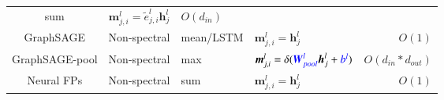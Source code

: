 \begin{table}
\begin{footnotesize}
\begin{tabular}{ccp{8em}p{22em}r}
            sum                                                                                                                       &
            $\boldsymbol{m}_{j, i}^l = \tilde{e}_{j, i}^l \boldsymbol{h}_j^l$                                                         &
            $O(d_{in})$                                                                                                                 \\
            GraphSAGE \cite{hamilton2017_graphsage}                                                                                   &
            Non-spectral                                                                                                              &
            mean/LSTM                                                                                                                 &
            $\boldsymbol{m}_{j, i}^l =  \boldsymbol{h}_j^l$                                                                           &
            $O(1)$                                                                                                                      \\
            GraphSAGE-pool \cite{hamilton2017_graphsage}                                                                              &
            Non-spectral                                                                                                              &
            max                                                                                                                       &
            $\boldsymbol{m}_{j, i}^l =  \delta(\textcolor{blue}{\boldsymbol{W}^l_{pool}} \boldsymbol{h}_j^l + \textcolor{blue}{b^l})$ &
            $O(d_{in} * d_{out})$                                                                                                       \\
            Neural FPs  \cite{duvenaud2015_neural_fps}                                                                                &
            Non-spectral                                                                                                              &
            sum                                                                                                                       &
            $\boldsymbol{m}_{j, i}^l = \boldsymbol{h}_j^l$                                                                            &
            $O(1)$                                                                                                                      \\

\end{tabular}
\end{footnotesize}
\end{table}
